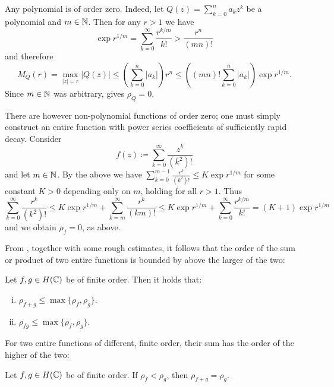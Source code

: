 \begin{remark} \label{rem:order-zero}
    Any polynomial is of order zero. Indeed, let $Q(z) = \sum_{k=0}^n a_k z^k$ be a polynomial and $m \in \mathbb{N}$. Then for any $r > 1$ we have
    $$ \exp r^{1/m} = \sum_{k=0}^\infty \frac{r^{k/m}}{k!} > \frac{r^{n}}{(mn)!} $$
    and therefore
    $$ M_Q(r) = \max_{\vert z \vert = r} \vert Q(z) \vert \leq \left( \sum_{k=0}^n \vert a_k \vert \right) r^n \leq \left( (mn)! \sum_{k=0}^n \vert a_k \vert \right) \exp r^{1/m}. $$
    Since $m \in \mathbb{N}$ was arbitrary,  gives $\rho_Q = 0$.

    There are however non-polynomial functions of order zero; one must simply construct an entire function with power series coefficients of sufficiently rapid decay. Consider
    $$ f(z) \coloneqq \sum_{k=0}^\infty \frac{z^k}{(k^2)!} $$
    and let $m \in \mathbb{N}$. By the above we have $\sum_{k=0}^{m-1} \frac{r^k}{(k^2)!} \leq K \exp r^{1/m}$ for some constant $K > 0$ depending only on $m$, holding for all $r > 1$. Thus
    $$ \sum_{k=0}^\infty \frac{r^k}{(k^2)!} \leq K \exp r^{1/m} + \sum_{k=m}^\infty \frac{r^k}{(km)!} \leq K \exp r^{1/m} + \sum_{k=0}^\infty \frac{r^{k/m}}{k!} = (K + 1) \exp r^{1/m} $$
    and we obtain $\rho_f = 0$, as above.
\end{remark}

From , together with some rough estimates, it follows that the order of the sum or product of two entire functions is bounded by above the larger of the two:

\begin{proposition} \label{prop:order-sum-product-estimate}
    Let $f, g \in H(\mathbb{C})$ be of finite order. Then it holds that:
    \begin{enumerate}[i.]
        \item $\rho_{f + g} \leq \max \{ \rho_f, \rho_g \}$.
        \item $\rho_{fg} \leq \max \{ \rho_f, \rho_g \}$.
    \end{enumerate}
\end{proposition}

For two entire functions of different, finite order, their sum has the order of the higher of the two:

\begin{proposition} \label{prop:order-sum-equality}
    Let $f, g \in H(\mathbb{C})$ be of finite order. If $\rho_f < \rho_g$, then $\rho_{f + g} = \rho_g$.
\end{proposition}

